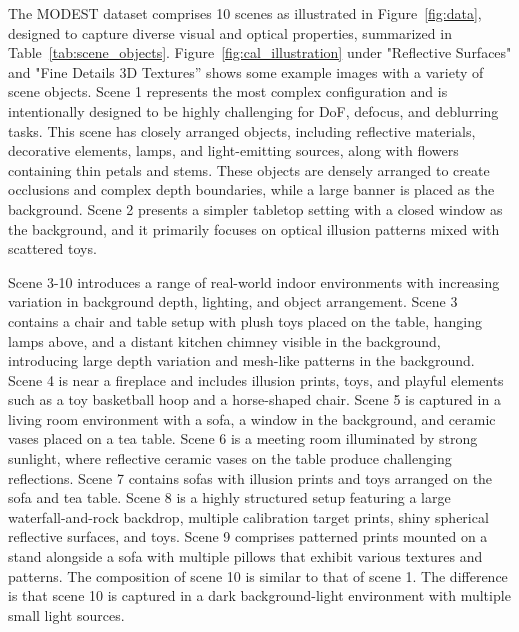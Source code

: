 The MODEST dataset comprises 10 scenes as illustrated in Figure~\ref{fig:data}, designed to capture diverse visual and optical properties, summarized in Table~\ref{tab:scene_objects}. Figure~\ref{fig:cal_illustration} under "Reflective Surfaces" and "Fine Details 3D Textures” shows some example images with a variety of scene objects. Scene 1 represents the most complex configuration and is intentionally designed to be highly challenging for DoF, defocus, and deblurring tasks. This scene has closely arranged objects, including reflective materials, decorative elements, lamps, and light-emitting sources, along with flowers containing thin petals and stems. These objects are densely arranged to create occlusions and complex depth boundaries, while a large banner is placed as the background. Scene 2 presents a simpler tabletop setting with a closed window as the background, and it primarily focuses on optical illusion patterns mixed with scattered toys.

Scene 3-10 introduces a range of real-world indoor environments with increasing variation in background depth, lighting, and object arrangement. Scene 3 contains a chair and table setup with plush toys placed on the table, hanging lamps above, and a distant kitchen chimney visible in the background, introducing large depth variation and mesh-like patterns in the background. Scene 4 is near a fireplace and includes illusion prints, toys, and playful elements such as a toy basketball hoop and a horse-shaped chair. Scene 5 is captured in a living room environment with a sofa, a window in the background, and ceramic vases placed on a tea table. Scene 6 is a meeting room illuminated by strong sunlight, where reflective ceramic vases on the table produce challenging reflections. Scene 7 contains sofas with illusion prints and toys arranged on the sofa and tea table. Scene 8 is a highly structured setup featuring a large waterfall-and-rock backdrop, multiple calibration target prints, shiny spherical reflective surfaces, and toys. Scene 9 comprises patterned prints mounted on a stand alongside a sofa with multiple pillows that exhibit various textures and patterns. The composition of scene 10 is similar to that of scene 1. The difference is that scene 10 is captured in a dark background-light environment with multiple small light sources.


